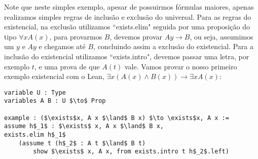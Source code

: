 Note que neste simples exemplo, apesar de possuirmos fórmulas maiores, apenas realizamos simples regras de inclusão e exclusão
do universal.
\newline Para as regras do existencial, na exclusão utilizamos ``exists.elim" seguida por uma proposição do tipo $\forall x A(x)$,
para provarmos $B$, devemos provar $ A y \to B$, ou seja, assumimos um $y$ e $A y$ e chegamos até $B$, concluindo assim a exclusão
do existencial. Para a inclusão do existencial utilizamos ``exists.intro", devemos passar uma letra, por exemplo $t$, e uma prova
de que $A(t)$ vale.
\newline Vamos provar o nosso primeiro exemplo existencial com o Lean, $\exists x (A(x) \land B(x)) \to \exists x A(x)$:
\begin{lstlisting}
variable U : Type
variables A B : U $\to$ Prop

example : ($\exists$x, A x $\land$ B x) $\to \exists$x, A x :=
assume h$_1$ : $\exists$ x, A x $\land$ B x,
exists.elim h$_1$
    (assume t (h$_2$ : A t $\land$ B t)
        show $\exists$ x, A x, from exists.intro t h$_2$.left) 
\end{lstlisting}
